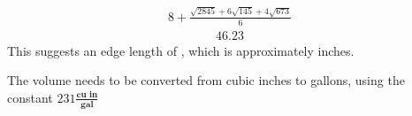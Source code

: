 \documentclass[letterpaper,10pt,english]{sphinxmanual}
\begin{document}
\begin{sphinxVerbatim}[commandchars=\\\{\}]
 
 
\end{sphinxVerbatim}
\begin{equation*}
\begin{split}\displaystyle 8 + \frac{\sqrt{2845} + 6 \sqrt{145} + 4 \sqrt{673}}{6}\end{split}
\end{equation*}\begin{equation*}
\begin{split}\displaystyle 46.23\end{split}
\end{equation*}
\sphinxAtStartPar
This suggests an edge length of ,
which is approximately  inches.

\sphinxAtStartPar
The volume needs to be converted from cubic inches to gallons, using the constant \(231 \frac{\textbf{cu in}}{\textbf{gal}}\)

\begin{sphinxVerbatim}[commandchars=\\\{\}]
        
\end{sphinxVerbatim}
\end{document}
